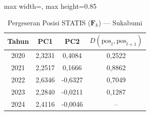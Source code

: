 \begin{table}[H]
\centering
\caption{Pergeseran Posisi STATIS ($\mathbf{F}_k$) --- Sukabumi} \label{tab:app2jarak_statis_skor_sukabumi}
\begin{adjustbox}{max width=\textwidth, max height=0.85\textheight}
\begin{tabular}{|c|c|c|c|}
\hline
\textbf{Tahun} & \textbf{PC1} & \textbf{PC2} & \textbf{$D(\text{pos}_t, \text{pos}_{t+1})$} \\
\hline
2020 & 2,3231 & 0,4084 & 0,2522 \\
2021 & 2,2517 & 0,1666 & 0,8862 \\
2022 & 2,6346 & -0,6327 & 0,7049 \\
2023 & 2,2840 & -0,0211 & 0,1287 \\
2024 & 2,4116 & -0,0046 & -- \\
\hline
\end{tabular}
\end{adjustbox}
\end{table}